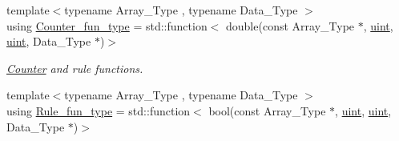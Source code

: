 \begin{DoxyCompactItemize}
\item 
{\footnotesize template$<$typename Array\+\_\+\+Type , typename Data\+\_\+\+Type $>$ }\\using \hyperlink{namespacebarry_abaaae3200da8e4b7faac3c04fe9c3081}{Counter\+\_\+fun\+\_\+type} = std\+::function$<$ double(const Array\+\_\+\+Type $\ast$, \hyperlink{namespacebarry_a11dfc53ddb4672278319aa04f1e09a6c}{uint}, \hyperlink{namespacebarry_a11dfc53ddb4672278319aa04f1e09a6c}{uint}, Data\+\_\+\+Type $\ast$)$>$
\begin{DoxyCompactList}\small\item\em \hyperlink{classbarry_1_1_counter}{Counter} and rule functions. \end{DoxyCompactList}\item 
{\footnotesize template$<$typename Array\+\_\+\+Type , typename Data\+\_\+\+Type $>$ }\\using \hyperlink{namespacebarry_aefd7e6d4ba228e2ce1074d075c512178}{Rule\+\_\+fun\+\_\+type} = std\+::function$<$ bool(const Array\+\_\+\+Type $\ast$, \hyperlink{namespacebarry_a11dfc53ddb4672278319aa04f1e09a6c}{uint}, \hyperlink{namespacebarry_a11dfc53ddb4672278319aa04f1e09a6c}{uint}, Data\+\_\+\+Type $\ast$)$>$
\end{DoxyCompactItemize}

